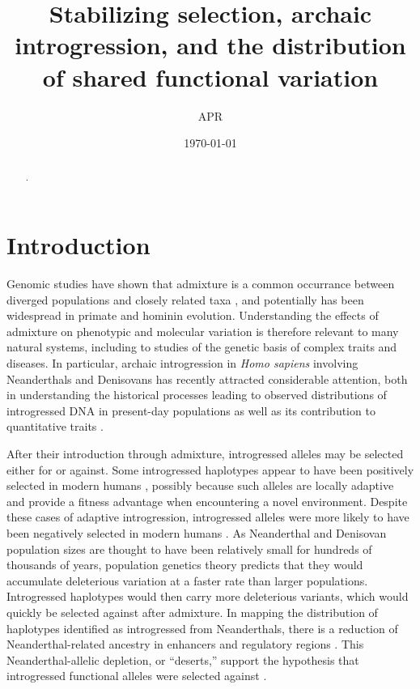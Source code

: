 \documentclass{article}
\title{Stabilizing selection, archaic introgression, and the distribution
of shared functional variation}
\author{APR}
\date{\today}
\begin{document}
\maketitle    

\begin{abstract}
    .
\end{abstract}

\section*{Introduction}

Genomic studies have shown that admixture is a common occurrance between
diverged populations and closely related taxa \citep{}, and potentially has
been widespread in primate \citep{} and hominin \citep{} evolution.
Understanding the effects of admixture on phenotypic and molecular variation is
therefore relevant to many natural systems, including to studies of the genetic
basis of complex traits and diseases. In particular, archaic introgression in
\emph{Homo sapiens} involving Neanderthals and Denisovans has recently
attracted considerable attention, both in understanding the historical
processes leading to observed distributions of introgressed DNA in present-day
populations \citep{prufer2014complete,villanea20??,chen2020identifying} as well
as its contribution to quantitative traits \citep{sankararaman,wei,others}.

After their introduction through admixture, introgressed alleles may be
selected either for or against. Some introgressed haplotypes appear to have
been positively selected in modern humans
\citep{huerta2014altitude,gower2021detecting,Enard}, possibly because such
alleles are locally adaptive and provide a fitness advantage when encountering
a novel environment. Despite these cases of adaptive introgression,
introgressed alleles were more likely to have been negatively selected in
modern humans \citep{harris2016genetic,juric2016strength}. As Neanderthal and
Denisovan population sizes are thought to have been relatively small for
hundreds of thousands of years, population genetics theory predicts that they
would accumulate deleterious variation at a faster rate than larger
populations.  Introgressed haplotypes would then carry more deleterious
variants, which would quickly be selected against after admixture. In mapping
the distribution of haplotypes identified as introgressed from Neanderthals,
there is a reduction of Neanderthal-related ancestry in enhancers and
regulatory regions
\citep{petr2019limits,telis2020selection,yermakovich2023long}. This
Neanderthal-allelic depletion, or ``deserts,'' support the hypothesis that
introgressed functional alleles were selected against
\citep{sankararaman2014genomic,sankararaman2016combined}.
\end{document}
